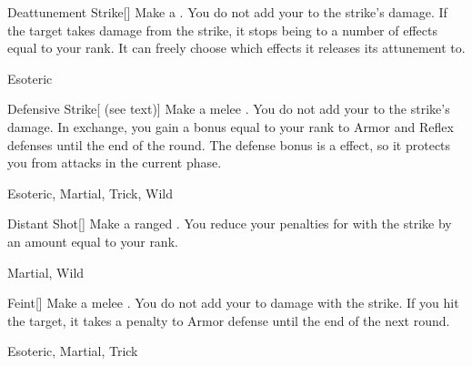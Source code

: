 \lowercase{\hypertarget{maneuver:Deattunement Strike}{}}\label{maneuver:Deattunement Strike}
\hypertarget{maneuver:Deattunement Strike}{}
\begin{freeability}[Rank 2]{Deattunement Strike}[]
Make a .
You do not add your  to the strike's damage.
If the target takes damage from the strike, it stops being  to a number of effects equal to your rank.
It can freely choose which effects it releases its attunement to.


 Esoteric
\end{freeability}
\vspace{0.25em}



\lowercase{\hypertarget{maneuver:Defensive Strike}{}}\label{maneuver:Defensive Strike}
\hypertarget{maneuver:Defensive Strike}{}
\begin{freeability}[Rank 2]{Defensive Strike}[ (see text)]
Make a melee .
You do not add your  to the strike's damage.
In exchange, you gain a bonus equal to your rank to Armor and Reflex defenses until the end of the round.
The defense bonus is a  effect, so it protects you from attacks in the current phase.


 Esoteric, Martial, Trick, Wild
\end{freeability}
\vspace{0.25em}



\lowercase{\hypertarget{maneuver:Distant Shot}{}}\label{maneuver:Distant Shot}
\hypertarget{maneuver:Distant Shot}{}
\begin{freeability}[Rank 2]{Distant Shot}[]
Make a ranged .
You reduce your penalties for  with the strike by an amount equal to your rank.


 Martial, Wild
\end{freeability}
\vspace{0.25em}



\lowercase{\hypertarget{maneuver:Feint}{}}\label{maneuver:Feint}
\hypertarget{maneuver:Feint}{}
\begin{freeability}[Rank 2]{Feint}[]
Make a melee .
You do not add your  to damage with the strike.
If you hit the target, it takes a  penalty to Armor defense until the end of the next round.


 Esoteric, Martial, Trick
\end{freeability}
\vspace{0.25em}



